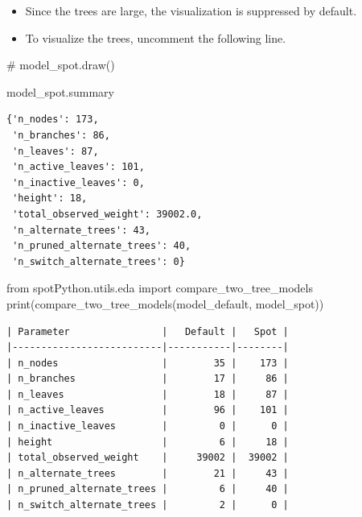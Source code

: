 \documentclass[
  letterpaper,
  DIV=11,
  numbers=noendperiod]{scrreprt}
\newenvironment{Shaded}{\begin{snugshade}}{\end{snugshade}}
\newcommand{\BuiltInTok}[1]{\textcolor[rgb]{0.00,0.23,0.31}{#1}}
\newcommand{\CommentTok}[1]{\textcolor[rgb]{0.37,0.37,0.37}{#1}}
\newcommand{\ImportTok}[1]{\textcolor[rgb]{0.00,0.46,0.62}{#1}}
\newcommand{\NormalTok}[1]{\textcolor[rgb]{0.00,0.23,0.31}{#1}}
\providecommand{\tightlist}{%
  \setlength{\itemsep}{0pt}\setlength{\parskip}{0pt}}\usepackage{longtable,booktabs,array}
\begin{document}
\begin{tcolorbox}[enhanced jigsaw, titlerule=0mm, colbacktitle=quarto-callout-caution-color!10!white, coltitle=black, arc=.35mm, toptitle=1mm, colback=white, left=2mm, opacityback=0, bottomtitle=1mm, bottomrule=.15mm, breakable, opacitybacktitle=0.6, colframe=quarto-callout-caution-color-frame, rightrule=.15mm, toprule=.15mm, leftrule=.75mm, title=\textcolor{quarto-callout-caution-color}{\faFire}\hspace{0.5em}{Caution: Large Trees}]

\begin{itemize}
\tightlist
\item
  Since the trees are large, the visualization is suppressed by default.
\item
  To visualize the trees, uncomment the following line.
\end{itemize}

\end{tcolorbox}

\begin{Shaded}
\begin{Highlighting}[]
\CommentTok{\# model\_spot.draw()}
\end{Highlighting}
\end{Shaded}

\begin{Shaded}
\begin{Highlighting}[]
\NormalTok{model\_spot.summary}
\end{Highlighting}
\end{Shaded}

\begin{verbatim}
{'n_nodes': 173,
 'n_branches': 86,
 'n_leaves': 87,
 'n_active_leaves': 101,
 'n_inactive_leaves': 0,
 'height': 18,
 'total_observed_weight': 39002.0,
 'n_alternate_trees': 43,
 'n_pruned_alternate_trees': 40,
 'n_switch_alternate_trees': 0}
\end{verbatim}

\begin{Shaded}
\begin{Highlighting}[]
\ImportTok{from}\NormalTok{ spotPython.utils.eda }\ImportTok{import}\NormalTok{ compare\_two\_tree\_models}
\BuiltInTok{print}\NormalTok{(compare\_two\_tree\_models(model\_default, model\_spot))}
\end{Highlighting}
\end{Shaded}

\begin{verbatim}
| Parameter                |   Default |   Spot |
|--------------------------|-----------|--------|
| n_nodes                  |        35 |    173 |
| n_branches               |        17 |     86 |
| n_leaves                 |        18 |     87 |
| n_active_leaves          |        96 |    101 |
| n_inactive_leaves        |         0 |      0 |
| height                   |         6 |     18 |
| total_observed_weight    |     39002 |  39002 |
| n_alternate_trees        |        21 |     43 |
| n_pruned_alternate_trees |         6 |     40 |
| n_switch_alternate_trees |         2 |      0 |
\end{verbatim}
\end{document}
